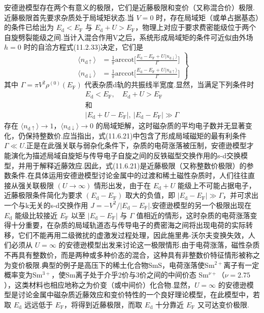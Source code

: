 安德逊模型存在两个有意义的极限，它们是近藤极限和变价（又称混合价）极限.近藤极限首先要求杂质处于局域矩状态.当 $V=0$ 时，存在局域矩（或单占据基态）的条件已给出为 $E_{\mathrm{d}}<E_{\mathrm{F}}$ 与 $E_{\mathrm{d}}+U>E_{\mathrm{F}}$，物理上对应于要求费密能级位于两个自旋劈裂能级之间.当计入混合作用V之后，系统形成局域矩的条件可近似由外场 $h=0$ 时的自洽方程式(11.2.33)决定，它们是
\begin{equation}
\left.
\begin{aligned}
  \langle n_{\mathrm{d}\uparrow}\rangle
  &=\frac{1}{\pi}\mathrm{arccot}
  \biggl[\frac{E_{\mathrm{d}}-E_{\mathrm{F}}
  +U\langle n_{\mathrm{d}\downarrow}\rangle}{\Gamma}\biggr]\\
  \langle n_{\mathrm{d}\downarrow}\rangle
  &=\frac{1}{\pi}\mathrm{arccot}
  \biggl[\frac{E_{\mathrm{d}}-E_{\mathrm{F}}
  +U\langle n_{\mathrm{d}\uparrow}\rangle}{\Gamma}\biggr]
\end{aligned}\right\}
\end{equation}
其中 $\Gamma=\pi V^{2}\rho^{(0)}(E_{\mathrm{F}})$ 代表杂质d轨的共振线半宽度.显然，当满足下列条件时
\begin{equation}
\begin{gathered}
  E_{\mathrm{d}}<E_{\mathrm{F}},
  \quad E_{\mathrm{d}}+U>E_{\mathrm{F}}\\
  \text{和}\\
  |E_{\mathrm{d}}+U-E_{\mathrm{F}}|,\ |E_{\mathrm{d}}-E_{\mathrm{F}}|\gg\Gamma
\end{gathered}
\end{equation}
存在 $\langle n_{\mathrm{d}\uparrow}\rangle\to1$，$\langle n_{\mathrm{d}\downarrow}\rangle\to0$ 的局域矩解，这时磁杂质的平均电子数并无显著变化，仍保持整数价.应当指出，式(11.6.21)中包含了形成局域磁矩的最有利条件 $\Gamma\ll U$.正是在此强关联与弱杂化条件下，杂质的电荷涨落被压制，安德逊模型才能演化为描述局域自旋矩与传导电子自旋之间的反铁磁型交换作用的s-d交换模型，并用于解释近藤效应.因此，式(11.6.21)是近藤极限（又称整数价极限）的参数条件.在具体运用安德逊模型讨论金属中的过渡和稀土磁性杂质时，人们往往直接从强关联极限 $(U\to\infty)$ 情形出发，由于在 $E_{\mathrm{d}}+U$ 能级上不可能占据电子，近藤极限条件简化为要求 $(E_{\mathrm{d}}-E_{\mathrm{F}})$ 取大的负值，即 $|E_{\mathrm{d}}-E_{\mathrm{F}}|\gg\Gamma$，并可求出一个与k无关的s-d交换作用 $J=-V^{2}/|E_{\mathrm{d}}-E_{\mathrm{F}}|$.安德逊模型的另一个极限出现在 $E_{\mathrm{d}}$ 能级比较接近 $E_{\mathrm{F}}$ 以至 $|E_{\mathrm{d}}-E_{\mathrm{F}}|$ 与 $\Gamma$ 值相近的情形，这时杂质的电荷涨落变得十分重要，在杂质的局域轨道态与传导电子的费密海之间将出现电荷的实际转移，它们不能再用二级微扰的虚激发过程处理，因此施里弗-沃尔夫变换失效，人们必须从 $U=\infty$ 的安德逊模型出发来讨论这一极限情形.由于电荷涨落，磁性杂质不再具有整数价，而是两种或多种价态的混合，这种具有非整数价特征情形被称之为变价极限.典型的例子是高压下的稀土化合物SmS，电荷涨落使Sm$^{2+}$离子有一定概率变为Sm$^{3+}$，使Sm离子处于介乎2价与3价之间的中间价态 Sm$^{\nu+}$（$\nu=2.75$），这类材料也相应地称之为价变（或中间价）化合物.显然，$U=\infty$ 的安德逊模型是讨论金属中磁杂质近藤效应和变价特性的一个良好理论模型，在此模型中，若取 $E_{\mathrm{d}}$ 远远低于 $E_{\mathrm{F}}$，将得到近藤极限，而取 $E_{\mathrm{d}}$ 十分靠近 $E_{\mathrm{F}}$ 又可达变价极限.

